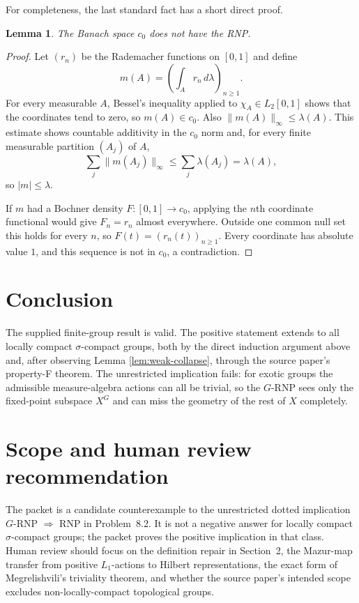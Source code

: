 \documentclass[11pt]{article}
\newtheorem{lemma}[theorem]{Lemma}
\theoremstyle{remark}
\begin{document}
For completeness, the last standard fact has a short direct proof.

\begin{lemma}\label{lem:c0}
The Banach space $c_0$ does not have the RNP.
\end{lemma}

\begin{proof}
Let $(r_n)$ be the Rademacher functions on $[0,1]$ and define
\[
 m(A)=\left(\int_A r_n\,d\lambda\right)_{n\geq1}.
\]
For every measurable $A$, Bessel's inequality applied to
$\chi_A\in L_2[0,1]$ shows that the coordinates tend to zero, so
$m(A)\in c_0$.  Also $\|m(A)\|_\infty\leq\lambda(A)$.  This estimate shows
countable additivity in the $c_0$ norm and, for every finite measurable
partition $(A_j)$ of $A$,
\[
 \sum_j\|m(A_j)\|_\infty\leq\sum_j\lambda(A_j)=\lambda(A),
\]
so $|m|\leq\lambda$.

If $m$ had a Bochner density $F:[0,1]\to c_0$, applying the $n$th coordinate
functional would give $F_n=r_n$ almost everywhere.  Outside one common null
set this holds for every $n$, so
$F(t)=(r_n(t))_{n\geq1}$.  Every coordinate has absolute value $1$, and this
sequence is not in $c_0$, a contradiction.
\end{proof}

\section{Conclusion}

The supplied finite-group result is valid.  The positive statement extends
to all locally compact $\sigma$-compact groups, both by the direct induction
argument above and, after observing Lemma \ref{lem:weak-collapse}, through
the source paper's property-F theorem.  The unrestricted implication fails:
for exotic groups the admissible measure-algebra actions can all be trivial,
so the $G$-RNP sees only the fixed-point subspace $X^G$ and can miss the
geometry of the rest of $X$ completely.

\section{Scope and human review recommendation}

The packet is a candidate counterexample to the unrestricted dotted
implication $G$-RNP $\Rightarrow$ RNP in Problem~8.2.  It is not a negative
answer for locally compact $\sigma$-compact groups; the packet proves the
positive implication in that class.  Human review should focus on the
definition repair in Section~2, the Mazur-map transfer from positive
$L_1$-actions to Hilbert representations, the exact form of Megrelishvili's
triviality theorem, and whether the source paper's intended scope excludes
non-locally-compact topological groups.
\end{document}
